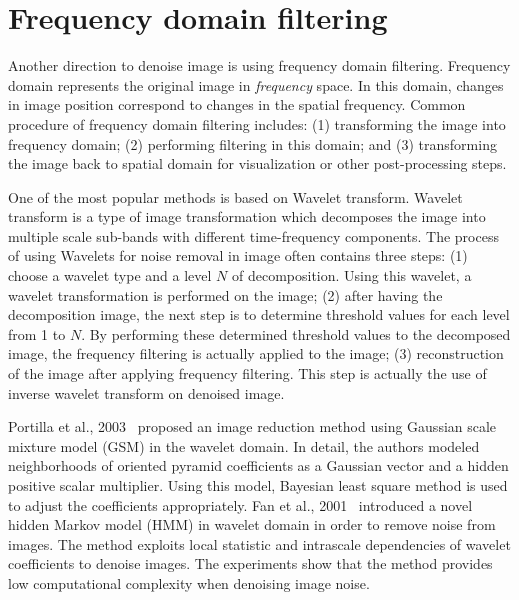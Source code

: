 %
\section{Frequency domain filtering}

Another direction to denoise image is using frequency domain filtering. Frequency domain represents the original image in \textit{frequency} space. In this domain, changes in image position correspond to changes in the spatial frequency. Common procedure of frequency domain filtering includes: (1) transforming the image into frequency domain; (2) performing filtering in this domain; and (3) transforming the image back to spatial domain for visualization or other post-processing steps.

One of the most popular methods is based on Wavelet transform. Wavelet transform is a type of image transformation which decomposes the image into multiple scale sub-bands with different time-frequency components. The process of using Wavelets for noise removal in image often contains three steps: (1) choose a wavelet type and a level $N$ of decomposition. Using this wavelet, a wavelet transformation is performed on the image; (2) after having the decomposition image, the next step is to determine threshold values for each level from 1 to $N$. By performing these determined threshold values to the decomposed image, the frequency filtering is actually applied to the image; (3) reconstruction of the image after applying frequency filtering. This step is actually the use of inverse wavelet transform on denoised image.

Portilla et al., 2003~\cite{portilla2003image} proposed an image reduction method using Gaussian scale mixture model (GSM) in the wavelet domain. In detail, the authors modeled neighborhoods of oriented pyramid coefficients as a Gaussian vector and a hidden positive scalar multiplier. Using this model, Bayesian least square method is used to adjust the coefficients appropriately. Fan et al., 2001~\cite{fan2001image} introduced a novel hidden Markov model (HMM) in wavelet domain in order to remove noise from images. The method exploits local statistic and intrascale dependencies of wavelet coefficients to denoise images. The experiments show that the method provides low computational complexity when denoising image noise.

